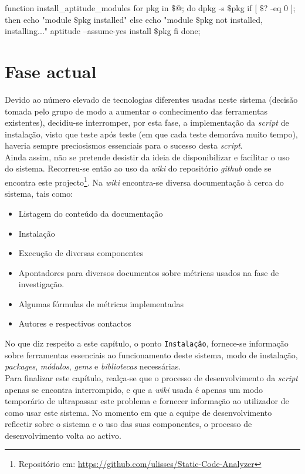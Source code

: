 \begin{myxml}
function install_aptitude_modules {
        for pkg in $\$$@; do
                dpkg -s $\$$pkg
                if [ $\$$? -eq 0 ]; then
                        echo "module $\$$pkg installed"
                else
                        echo "module $\$$pkg not installed, installing..."
                        aptitude --assume-yes install $\$$pkg
                fi
        done;
}
\end{myxml}

\section{Fase actual}

Devido ao número elevado de tecnologias diferentes usadas neste sistema (decisão tomada pelo grupo de modo a aumentar o conhecimento das ferramentas existentes), decidiu-se interromper, por esta fase, a implementação da \emph{script} de instalação, visto que teste após teste (em que cada teste demoráva muito tempo), haveria sempre preciosismos essenciais para o sucesso desta \emph{script}.\\

Ainda assim, não se pretende desistir da ideia de disponibilizar e facilitar o uso do sistema. Recorreu-se então ao uso da \emph{wiki} do repositório \emph{github} onde se encontra este projecto\footnote{Repositório em: \url{https://github.com/ulisses/Static-Code-Analyzer}}. Na \emph{wiki} encontra-se diversa documentação à cerca do sistema, tais como:

\begin{itemize}
 \item Listagem do conteúdo da documentação 
 \item Instalação
 \item Execução de diversas componentes
 \item Apontadores para diversos documentos sobre métricas usados na fase de investigação.
 \item Algumas fórmulas de métricas implementadas
 \item Autores e respectivos contactos
\end{itemize}

No que diz respeito a este capítulo, o ponto \texttt{Instalação}, fornece-se informação sobre ferramentas essenciais ao funcionamento deste sistema, modo de instalação, \emph{packages}, \emph{módulos}, \emph{gems} e \emph{bibliotecas} necessárias.\\

Para finalizar este capítulo, realça-se que o processo de desenvolvimento da \emph{script} apenas se encontra interrompido, e que a \emph{wiki} usada é apenas um modo temporário de ultrapassar este problema e fornecer informação ao utilizador de como usar este sistema. No momento em que a equipe de desenvolvimento reflectir sobre o sistema e o uso das suas componentes, o processo de desenvolvimento volta ao activo.
